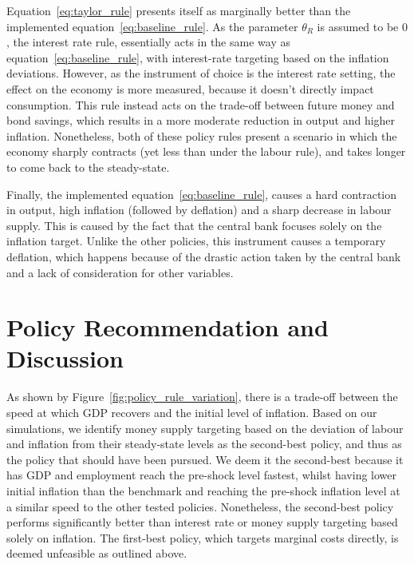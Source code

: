 \documentclass[12pt]{article}
\begin{document}
Equation~\ref{eq:taylor_rule} presents itself as marginally better than the implemented equation~\ref{eq:baseline_rule}. As the parameter $\theta_R$ is assumed to be $0$, the interest rate rule, essentially acts in the same way as equation~\ref{eq:baseline_rule}, with interest-rate targeting based on the inflation deviations. However, as the instrument of choice is the interest rate setting, the effect on the economy is more measured, because it doesn't directly impact consumption. This rule instead acts on the trade-off between future money and bond savings, which results in a more moderate reduction in output and higher inflation. Nonetheless, both of these policy rules present a scenario in which the economy sharply contracts (yet less than under the labour rule), and takes longer to come back to the steady-state. 

Finally, the implemented equation~\ref{eq:baseline_rule}, causes a hard contraction in output, high inflation (followed by deflation) and a sharp decrease in labour supply. This is caused by the fact that the central bank focuses solely on the inflation target. Unlike the other policies, this instrument causes a temporary deflation, which happens because of the drastic action taken by the central bank and a lack of consideration for other variables.




\section{Policy Recommendation and Discussion }\label{s:discussion}

As shown by Figure~\ref{fig:policy_rule_variation}, there is a trade-off between the speed at which GDP recovers and the initial level of inflation. Based on our simulations, we identify money supply targeting based on the deviation of labour and inflation from their steady-state levels as the second-best policy, and thus as the policy that should have been pursued. We deem it the second-best because it has GDP and employment reach the pre-shock level fastest, whilst having lower initial inflation than the benchmark and reaching the pre-shock inflation level at a similar speed to the other tested policies. Nonetheless, the second-best policy performs significantly better than interest rate or money supply targeting based solely on inflation. The first-best policy, which targets marginal costs directly, is deemed unfeasible as outlined above. 
\end{document}
